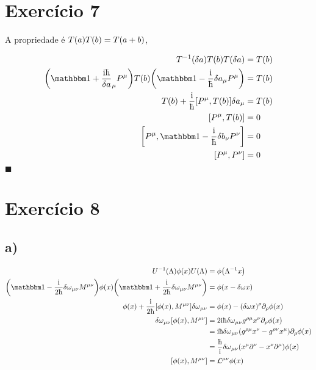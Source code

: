 \documentclass[twoside]{amsart}
\newcommand{\cqd}{\hfill$\blacksquare$}
\numberwithin{equation}{section}
\begin{document}

\section{Exercício 7}

A propriedade é $T\qty(a)T\qty(b)=T\qty(a+b)$,

\begin{align*}
    T^{-1}\qty(\delta a)T\qty(b)T\qty(\delta a)&=T\qty(b)\\
    \qty(\mathbbm 1+\frac{\im\hbar}{\delta a}_\mu P^\mu)T\qty(b)\qty(\mathbbm 1-\frac\im\hbar{\delta a}_\mu P^\mu)&=T\qty(b)\\
    T\qty(b)+\frac\im\hbar\comm{P^\mu}{T\qty(b)}{\delta a}_\mu&=T\qty(b)\\
    \comm{P^\mu}{T\qty(b)}&=0\\
    \comm{P^\mu}{\mathbbm 1-\frac\im\hbar{\delta b}_\nu P^\nu}&=0\\
    \comm{P^\mu}{P^\nu}&=0
\end{align*}
\cqd


\section{Exercício 8}

\subsection*{\textbf{a)}}

\begin{align*}
    U^{-1}\qty(\Lambda)\phi\qty(x)U\qty(\Lambda)&=\phi\qty(\Lambda^{-1}x)\\
    \qty(\mathbbm 1-\frac{\im}{2\hbar}{\delta\omega}_{\mu\nu}M^{\mu\nu})\phi\qty(x)\qty(\mathbbm 1+\frac{\im}{2\hbar}{\delta\omega}_{\mu\nu}M^{\mu\nu})&=\phi\qty(x-\delta\omega x)\\
    \phi\qty(x)+\frac{\im}{2\hbar}\comm{\phi\qty(x)}{M^{\mu\nu}}{\delta\omega}_{\mu\nu}&=\phi\qty(x)-\qty(\delta\omega x)^\rho\partial_\rho\phi\qty(x)\\
    {\delta\omega}_{\mu\nu}\comm{\phi\qty(x)}{M^{\mu\nu}}&=2\im\hbar{\delta\omega}_{\mu\nu}g^{\rho\mu}x^\nu\partial_\rho\phi\qty(x)\\
    &=\im\hbar{\delta\omega}_{\mu\nu}\qty(g^{\rho\mu}x^\nu-g^{\rho\nu}x^\mu)\partial_\rho\phi\qty(x)\\
    &=\frac\hbar\im{\delta\omega}_{\mu\nu}\qty(x^\mu\partial^\nu-x^\nu\partial^\mu)\phi\qty(x)\\
    \comm{\phi\qty(x)}{M^{\mu\nu}}&={\mathcal L}^{\mu\nu}\phi\qty(x)
\end{align*}
\end{document}
